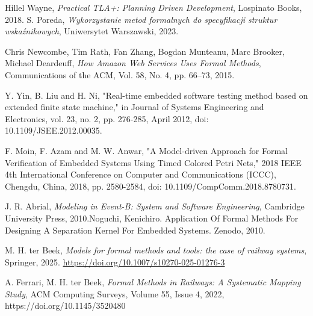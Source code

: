 \documentclass[conference]{IEEEtran}
\begin{document}
\begin{thebibliography}{00}
            Hillel Wayne, \emph{Practical TLA+: Planning Driven Development}, Lospinato Books, 2018.
            S. Poreda,
            \textit{Wykorzystanie metod formalnych do specyfikacji struktur wskaźnikowych},
            Uniwersytet Warszawski, 2023.

            Chris Newcombe, Tim Rath, Fan Zhang, Bogdan Munteanu, Marc Brooker, Michael Deardeuff, \emph{How Amazon Web Services Uses Formal Methods}, Communications of the ACM, Vol. 58, No. 4, pp. 66--73, 2015.
            
            Y. Yin, B. Liu and H. Ni, "Real-time embedded software testing method based on extended finite state machine," in Journal of Systems Engineering and Electronics, vol. 23, no. 2, pp. 276-285, April 2012, doi: 10.1109/JSEE.2012.00035.
            
            F. Moin, F. Azam and M. W. Anwar, "A Model-driven Approach for Formal Verification of Embedded Systems Using Timed Colored Petri Nets," 2018 IEEE 4th International Conference on Computer and Communications (ICCC), Chengdu, China, 2018, pp. 2580-2584, doi: 10.1109/CompComm.2018.8780731.
        
            J. R. Abrial, \emph{Modeling in Event-B: System and Software Engineering}, Cambridge University Press, 2010.Noguchi, Kenichiro. Application Of Formal Methods For Designing A Separation Kernel For Embedded Systems. Zenodo, 2010.
            
            M. H. ter Beek, \emph{Models for formal methods and tools: the case of railway systems}, Springer, 2025.
            \url{https://doi.org/10.1007/s10270-025-01276-3}
        
            A. Ferrari, M. H. ter Beek, \emph{Formal Methods in Railways: A Systematic Mapping Study}, ACM Computing Surveys, Volume 55, Issue 4, 2022, https://doi.org/10.1145/3520480
        \end{thebibliography}
\end{document}
